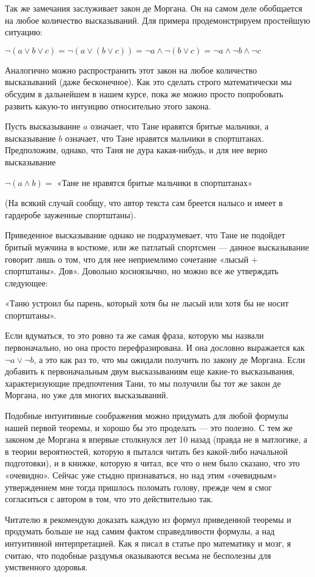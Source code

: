 Так же замечания заслуживает закон де Моргана. Он на самом деле обобщается на любое количество высказываний. Для примера продемонстрируем простейшую ситуацию:

$\neg(a \vee b \vee c) = \neg(a \vee (b \vee c)) = \neg a \wedge \neg (b \vee c) = \neg a \wedge \neg b \wedge \neg c$

Аналогично можно распространить этот закон на любое количество высказываний (даже бесконечное). Как это сделать строго математически мы обсудим в дальнейшем в нашем курсе, пока же можно просто попробовать развить какую-то интуицию относительно этого закона.

Пусть высказывание $a$ означает, что Тане нравятся бритые мальчики, а высказывание $b$ означает, что Тане нравятся мальчики в спортштанах. Предположим, однако, что Таня не дура какая-нибудь, и для нее верно высказывание

$\neg(a \wedge b) =$ «Тане не нравятся бритые мальчики в спортштанах»

(На всякий случай сообщу, что автор текста сам бреется налысо и имеет в гардеробе зауженные спортштаны).

Приведенное высказывание однако не подразумевает, что Тане не подойдет бритый мужчина в костюме, или же патлатый спортсмен — данное высказывание говорит лишь о том, что для нее неприемлимо сочетание «лысый + спортштаны». Дов». Довольно косноязычно, но можно все же утверждать следующее:

«Таню устроил бы парень, который хотя бы не лысый или хотя бы не носит спортштаны».

Если вдуматься, то это ровно та же самая фраза, которую мы назвали первоначально, но она просто перефразирована. И она дословно выражается как $\neg a \vee \neg b$, а это как раз то, что мы ожидали получить по закону де Моргана. Если добавить к первоначальным двум высказываниям еще какие-то высказывания, характеризующие предпочтения Тани, то мы получили бы тот же закон де Моргана, но уже для многих высказываний.

Подобные интуитивные соображения можно придумать для любой формулы нашей первой теоремы, и хорошо бы это проделать — это полезно. С тем же законом де Моргана я впервые столкнулся лет 10 назад (правда не в матлогике, а в теории вероятностей, которую я пытался читать без какой-либо начальной подготовки), и в книжке, которую я читал, все что о нем было сказано, что это «очевидно». Сейчас уже стыдно признаваться, но над этим «очевидным» утверждением мне тогда пришлось поломать голову, прежде чем я смог согласиться с автором в том, что это действительно так.

Читателю я рекомендую доказать каждую из формул приведенной теоремы и продумать больше не над самим фактом справедливости формулы, а над интуитивной интерпретацией. Как я писал в статье про математику и мозг, я считаю, что подобные раздумья оказываются весьма не бесполезны для умственного здоровья.


